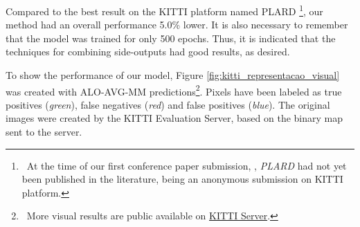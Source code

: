 Compared to the best result on the KITTI platform named PLARD \cite{Chen:2019}\footnote{~At the time of our first conference paper submission, \cite{Reis:2019}, \textit{PLARD} had not yet been published in the literature, being an anonymous submission on KITTI platform.}, our method had an overall performance 5.0\% lower.
It is also necessary to remember that the model was trained for only 500 epochs.
Thus, it is indicated that the techniques for combining side-outputs had good results, as desired.

To show the performance of our model, Figure \ref{fig:kitti_representacao_visual} was created with ALO-AVG-MM predictions\footnote{~More visual results are public available on \href{http://www.cvlibs.net/datasets/kitti/eval_road_detail.php?result=a5ca173550cb383caf3e12ca236d7c809489d2d9}{KITTI Server}.}.
Pixels have been labeled as true positives (\textit{green}), false negatives (\textit{red}) and false positives (\textit{blue}).
The original images were created by the KITTI Evaluation Server, based on the binary map sent to the server.


